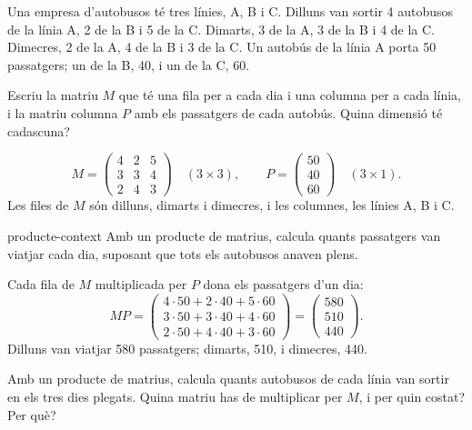 Una empresa d'autobusos té tres línies, A, B i C. Dilluns van sortir 4 autobusos de la línia A, 2 de la B
i 5 de la C. Dimarts, 3 de la A, 3 de la B i 4 de la C. Dimecres, 2 de la A, 4 de la B i 3 de la C. Un
autobús de la línia A porta 50 passatgers; un de la B, 40, i un de la C, 60.

\begin{apartats}

Escriu la matriu $M$ que té una fila per a cada dia i una columna per a cada línia, i la matriu columna
$P$ amb els passatgers de cada autobús. Quina dimensió té cadascuna?

\begin{solucio}
\[
M=\begin{pmatrix}4&2&5\\3&3&4\\2&4&3\end{pmatrix}\quad(3\times3),\qquad
P=\begin{pmatrix}50\\40\\60\end{pmatrix}\quad(3\times1).
\]
Les files de $M$ són dilluns, dimarts i dimecres, i les columnes, les línies A, B i C.
\end{solucio}

\begin{tria}{producte-context}
Amb un producte de matrius, calcula quants passatgers van viatjar cada dia, suposant que tots els
autobusos anaven plens.

\begin{solucio}
Cada fila de $M$ multiplicada per $P$ dona els passatgers d'un dia:
\[
MP=\begin{pmatrix}4\cdot50+2\cdot40+5\cdot60\\3\cdot50+3\cdot40+4\cdot60\\2\cdot50+4\cdot40+3\cdot60\end{pmatrix}
=\begin{pmatrix}580\\510\\440\end{pmatrix}.
\]
Dilluns van viatjar 580 passatgers; dimarts, 510, i dimecres, 440.
\end{solucio}

Amb un producte de matrius, calcula quants autobusos de cada línia van sortir en els tres dies plegats.
Quina matriu has de multiplicar per $M$, i per quin costat? Per què?


\end{tria}
\end{apartats}
